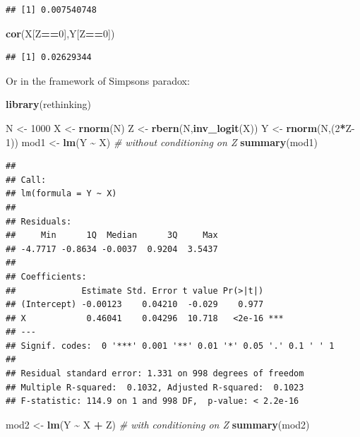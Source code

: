 \documentclass[
]{book}
\newenvironment{Shaded}{\begin{snugshade}}{\end{snugshade}}
\newcommand{\CommentTok}[1]{\textcolor[rgb]{0.56,0.35,0.01}{\textit{#1}}}
\newcommand{\DecValTok}[1]{\textcolor[rgb]{0.00,0.00,0.81}{#1}}
\newcommand{\FunctionTok}[1]{\textcolor[rgb]{0.13,0.29,0.53}{\textbf{#1}}}
\newcommand{\NormalTok}[1]{#1}
\newcommand{\OtherTok}[1]{\textcolor[rgb]{0.56,0.35,0.01}{#1}}
\newcommand{\SpecialCharTok}[1]{\textcolor[rgb]{0.81,0.36,0.00}{\textbf{#1}}}
\begin{document}
\begin{verbatim}
## [1] 0.007540748
\end{verbatim}

\begin{Shaded}
\begin{Highlighting}[]
\FunctionTok{cor}\NormalTok{(X[Z}\SpecialCharTok{==}\DecValTok{0}\NormalTok{],Y[Z}\SpecialCharTok{==}\DecValTok{0}\NormalTok{])}
\end{Highlighting}
\end{Shaded}

\begin{verbatim}
## [1] 0.02629344
\end{verbatim}

Or in the framework of Simpsons paradox:

\begin{Shaded}
\begin{Highlighting}[]
\FunctionTok{library}\NormalTok{(rethinking)}

\NormalTok{N }\OtherTok{\textless{}{-}} \DecValTok{1000}
\NormalTok{X }\OtherTok{\textless{}{-}} \FunctionTok{rnorm}\NormalTok{(N)}
\NormalTok{Z }\OtherTok{\textless{}{-}} \FunctionTok{rbern}\NormalTok{(N,}\FunctionTok{inv\_logit}\NormalTok{(X))}
\NormalTok{Y }\OtherTok{\textless{}{-}} \FunctionTok{rnorm}\NormalTok{(N,(}\DecValTok{2}\SpecialCharTok{*}\NormalTok{Z}\DecValTok{{-}1}\NormalTok{))}
\NormalTok{mod1 }\OtherTok{\textless{}{-}} \FunctionTok{lm}\NormalTok{(Y }\SpecialCharTok{\textasciitilde{}}\NormalTok{ X) }\CommentTok{\# without conditioning on Z}
\FunctionTok{summary}\NormalTok{(mod1)}
\end{Highlighting}
\end{Shaded}

\begin{verbatim}
## 
## Call:
## lm(formula = Y ~ X)
## 
## Residuals:
##     Min      1Q  Median      3Q     Max 
## -4.7717 -0.8634 -0.0037  0.9204  3.5437 
## 
## Coefficients:
##             Estimate Std. Error t value Pr(>|t|)    
## (Intercept) -0.00123    0.04210  -0.029    0.977    
## X            0.46041    0.04296  10.718   <2e-16 ***
## ---
## Signif. codes:  0 '***' 0.001 '**' 0.01 '*' 0.05 '.' 0.1 ' ' 1
## 
## Residual standard error: 1.331 on 998 degrees of freedom
## Multiple R-squared:  0.1032, Adjusted R-squared:  0.1023 
## F-statistic: 114.9 on 1 and 998 DF,  p-value: < 2.2e-16
\end{verbatim}

\begin{Shaded}
\begin{Highlighting}[]
\NormalTok{mod2 }\OtherTok{\textless{}{-}} \FunctionTok{lm}\NormalTok{(Y }\SpecialCharTok{\textasciitilde{}}\NormalTok{ X }\SpecialCharTok{+}\NormalTok{ Z) }\CommentTok{\# with conditioning on Z}
\FunctionTok{summary}\NormalTok{(mod2)}
\end{Highlighting}
\end{Shaded}
\end{document}
